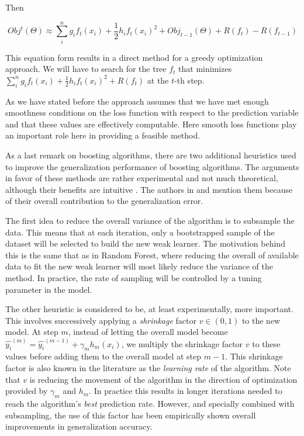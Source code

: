 \documentclass{article}%
\theoremstyle{definition}
\begin{document}
Then

\[
Obj^t(\Theta) \approx \sum_i^n {  g_i f_t(x_i) + \frac{1}{2} h_i f_t(x_i)^2 } +  Obj_{t-1}(\Theta) + R(f_t) - R(f_{t-1})
\]

This equation form results in a direct method for a greedy optimization approach.  We will have to search for the tree $f_t$ that minimizes \\
$\sum_i^n {  g_i f_t(x_i) + \frac{1}{2} h_i f_t(x_i)^2 } + R(f_t)$ at the $t$-th step. 

As we have stated before the approach assumes that we have met enough smoothness conditions on the loss function with respect to the prediction variable 
and that these values are effectively computable. Here smooth loss functions play an important role here in providing a feasible method. 

As a last remark on boosting algorithms, there are two additional heuristics used to improve the generalization performance of boosting algorithms. The arguments in favor of these methods are rather experimental and not much theoretical, although their benefits are intuitive . The authors in \cite{hastie-elemstatslearn} and \cite{bishop - patternRecognition} mention them because of their overall contribution to the generalization error.

The first idea to reduce the overall variance of the algorithm is to subsample the data. This means that at each iteration, only a bootstrapped sample of the dataset will be selected to build the new weak learner. The motivation behind this is the same that as in Random Forest, where reducing the overall of available data to fit the new weak learner will most likely reduce the variance of the method. In practice, the rate of sampling will be controlled by a tuning parameter in the model.

The other heuristic is considered to be, at least experimentally, more important. This involves successively applying a \textit{shrinkage} factor $v \in  (0,1)$ to the new model.  At step $m$, instead of letting the overall model become $ \hat{y_i}^{(m)} = \hat{y_i}^{(m-1)} +  \gamma_m h_m(x_i) $, we multiply the shrinkage factor $v$ to these values before adding them to the overall model at step $m-1$. This shrinkage factor is also known in the literature as the \textit{learning rate} of the algorithm.  Note that $v$  is reducing the movement of the algorithm in the direction of optimization provided by $\gamma_m$ and $h_m$. In practice this results in longer iterations needed to reach the algorithm's \textit{best} prediction rate. However, and specially combined with subsampling, the use of this factor has been empirically shown overall improvements in generalization accuracy.
\end{document}
